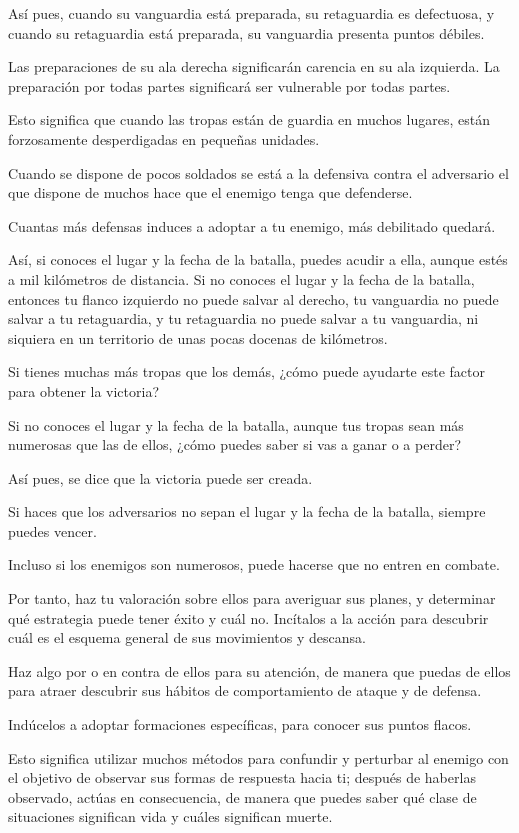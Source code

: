 Así pues, cuando su vanguardia está preparada, su retaguardia es defectuosa, y cuando su retaguardia está preparada, su vanguardia presenta puntos débiles.

Las preparaciones de su ala derecha significarán carencia en su ala izquierda. La preparación por todas partes significará ser vulnerable por todas partes.

Esto significa que cuando las tropas están de guardia en muchos lugares, están forzosamente desperdigadas en pequeñas unidades.

Cuando se dispone de pocos soldados se está a la defensiva contra el adversario el que dispone de muchos hace que el enemigo tenga que defenderse.

Cuantas más defensas induces a adoptar a tu enemigo, más debilitado quedará.

Así, si conoces el lugar y la fecha de la batalla, puedes acudir a ella, aunque estés a mil kilómetros de distancia. Si no conoces el lugar y la fecha de la batalla, entonces tu flanco izquierdo no puede salvar al derecho, tu vanguardia no puede salvar a tu retaguardia, y tu retaguardia no puede salvar a tu vanguardia, ni siquiera en un territorio de unas pocas docenas de kilómetros.

Si tienes muchas más tropas que los demás, ¿cómo puede ayudarte este factor para obtener la victoria?

Si no conoces el lugar y la fecha de la batalla, aunque tus tropas sean más numerosas que las de ellos, ¿cómo puedes saber si vas a ganar o a perder?

Así pues, se dice que la victoria puede ser creada.

Si haces que los adversarios no sepan el lugar y la fecha de la batalla, siempre puedes vencer.

Incluso si los enemigos son numerosos, puede hacerse que no entren en combate.

Por tanto, haz tu valoración sobre ellos para averiguar sus planes, y determinar qué estrategia puede tener éxito y cuál no. Incítalos a la acción para descubrir cuál es el esquema general de sus movimientos y descansa.

Haz algo por o en contra de ellos para su atención, de manera que puedas de ellos para atraer descubrir sus hábitos de comportamiento de ataque y de defensa.

Indúcelos a adoptar formaciones específicas, para conocer sus puntos flacos.

Esto significa utilizar muchos métodos para confundir y perturbar al enemigo con el objetivo de observar sus formas de respuesta hacia ti; después de haberlas observado, actúas en consecuencia, de manera que puedes saber qué clase de situaciones significan vida y cuáles significan muerte.

